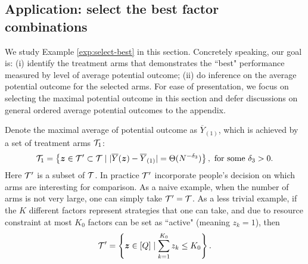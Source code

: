 \documentclass[12pt]{article}
\begin{document}

\subsection{Application: select the best factor combinations} 


We study Example \ref{exp:select-best} in this section. Concretely speaking, our goal is: (i) identify the treatment arms that demonstrates the ``best" performance measured by level of average potential outcome; (ii) do inference on the average potential outcome for the selected arms. For ease of presentation, we focus on selecting the maximal potential outcome in this section and defer discussions on general ordered average potential outcomes to the appendix. 

Denote the maximal average of potential outcome as $\overline{Y}_{(1)}$, which is achieved by a set of treatment arms ${\mathcal{T}}_{1}$:
\begin{align}\label{eqn:near-tie}
    {\mathcal{T}}_{1} = \left\{{\boldsymbol{z}}\in{\mathcal{T}}'\subset {\mathcal{T}}\mid|\overline{Y}({\boldsymbol{z}}) - \overline{Y}_{(1)}| =  \Theta(N^{-\delta_3})\right\},  \text{ for some } \delta_3 > 0.
\end{align}
Here ${\mathcal{T}}'$ is a subset of ${\mathcal{T}}$. In practice ${\mathcal{T}}'$ incorporate people's decision on which arms are interesting for comparison. As a naive example, when the number of arms is not very large, one can simply take $ {\mathcal{T}}' = {\mathcal{T}}$. As a less trivial example, if the $K$ different factors represent strategies that one can take, and due to resource constraint at most $K_0$ factors can be set as ``active" (meaning $z_k = 1$), then 
\begin{align*}
{\mathcal{T}}' = \left\{{\boldsymbol{z}}\in[Q]\mid \sum_{k=1}^{K_0}z_k \le K_0\right\}.
\end{align*}
\end{document}
